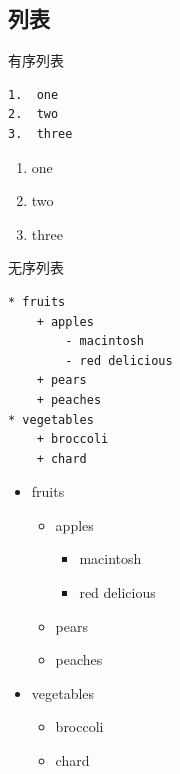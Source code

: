 \documentclass[10pt,ignorenonframetext,aspectratio=169,t,]{beamer} %
\providecommand{\tightlist}{%
  \setlength{\itemsep}{0pt}\setlength{\parskip}{0pt}}
\begin{document}
\subsection{列表}

\begin{frame}[fragile]{有序列表}

\begin{verbatim}
1.  one
2.  two
3.  three
\end{verbatim}

\begin{enumerate}
\def\labelenumi{\arabic{enumi}.}
\tightlist
\item
  one
\item
  two
\item
  three
\end{enumerate}

\end{frame}

\begin{frame}[fragile]{无序列表}

\begin{verbatim}
* fruits
    + apples
        - macintosh
        - red delicious
    + pears
    + peaches
* vegetables
    + broccoli
    + chard
\end{verbatim}

\begin{itemize}
\tightlist
\item
  fruits

  \begin{itemize}
  \tightlist
  \item
    apples

    \begin{itemize}
    \tightlist
    \item
      macintosh
    \item
      red delicious
    \end{itemize}
  \item
    pears
  \item
    peaches
  \end{itemize}
\item
  vegetables

  \begin{itemize}
  \tightlist
  \item
    broccoli
  \item
    chard
  \end{itemize}
\end{itemize}

\end{frame}
\end{document}
